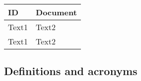 \documentclass{template/openetcs_article}
\begin{document}
\begin{flushleft}
\tablefirsthead{}
\tablehead{}
\tabletail{}
\tablelasttail{}
\begin{supertabular}{|m{3cm}|m{11cm}|}
\hline
{}
ID &
Document\\\hline
Text1 &
Text2\\\hline
Text1 &
Text2\\\hline
\end{supertabular}
\end{flushleft}

\subsection{Definitions and acronyms}
\tablehead{}
\tabletail{}
\tablelasttail{}
\end{document}
